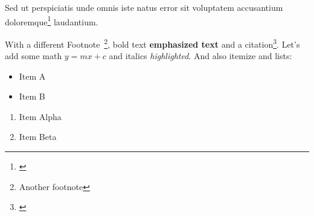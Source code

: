 \def \textwidth {15.92cm}
\def \threequartertextwidth {11.94cm}
\def \halftextwidth {7.96cm}
\def \onequartertextwidth {3.98cm}
\newcommand {\cite}[1]{\footnote{\label{#1}\textcite{#1}}}
\newcommand {\refcite}[1]{\footnote{See citation \ref{#1}}}

Sed ut perspiciatis unde omnis iste natus error sit voluptatem accusantium doloremque\cite{minsky2017perceptrons} laudantium.

With a different Footnote~\footnote{Another footnote}, bold text \textbf{emphasized text} and a citation\cite{einstein2013principle}. Let's add some math $y = mx + c$ and italics \textit{highlighted}. And also itemize and lists:
\begin{itemize}
	\item Item A
	\item Item B
\end{itemize}
\begin{enumerate}
	\item Item Alpha
	\item Item Beta
\end{enumerate}

